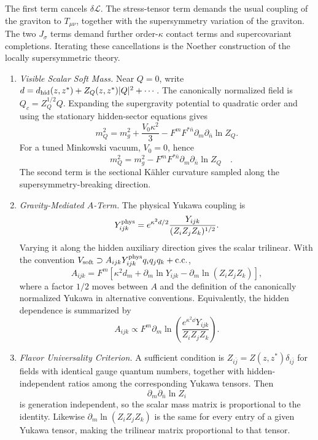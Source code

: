 \begin{enumerate}
  The first term cancels \(\delta\mathcal L\).  The stress-tensor term
  demands the usual coupling of the graviton to \(T_{\mu\nu}\), together
  with the supersymmetry variation of the graviton.  The two
  \(J_\sigma\) terms demand further order-\(\kappa\) contact terms and
  supercovariant completions.  Iterating these cancellations is the
  Noether construction of the locally supersymmetric theory.

  \begin{enumerate}
    \item \emph{Visible Scalar Soft Mass.}
    Near \(Q=0\), write
      \(d=d_{\rm hid}(z,z^*)+Z_Q(z,z^*)|Q|^2+\cdots\).
      The canonically normalized field is \(Q_c=Z_Q^{1/2}Q\).  Expanding the
      supergravity potential to quadratic order and using the stationary
      hidden-sector equations gives
      \[
        m_Q^2=m_g^2+\frac{V_0\kappa^2}{3}
          -F^mF^{*\bar n}
           \partial_m\partial_{\bar n}\ln Z_Q.
      \]
      For a tuned Minkowski vacuum, \(V_0=0\), hence
      \[
        \boxed{\quad m_Q^2=m_g^2
          -F^mF^{*\bar n}
           \partial_m\partial_{\bar n}\ln Z_Q\quad .}
      \]
      The second term is the sectional Kähler curvature sampled along the
      supersymmetry-breaking direction.
    \item \emph{Gravity-Mediated \(A\)-Term.}
    The physical Yukawa coupling is
      \[
        Y^{\rm phys}_{ijk}
          =e^{\kappa^2d/2}
            \frac{Y_{ijk}}{(Z_iZ_jZ_k)^{1/2}}.
      \]
      Varying it along the hidden auxiliary direction gives the scalar
      trilinear.  With the convention
      \(V_{\rm soft}\supset A_{ijk}Y^{\rm phys}_{ijk}q_iq_jq_k+\mathrm{c.c.}\),
      \[
        A_{ijk}
          =F^m\left[
            \kappa^2d_m+\partial_m\ln Y_{ijk}
            -\partial_m\ln(Z_iZ_jZ_k)
          \right],
      \]
      where a factor \(1/2\) moves between \(A\) and the definition of the
      canonically normalized Yukawa in alternative conventions.  Equivalently,
      the hidden dependence is summarized by
      \[
        A_{ijk}\propto
        F^m\partial_m\ln\!
          \left(\frac{e^{\kappa^2\dd}Y_{ijk}}{Z_iZ_jZ_k}\right).
      \]
    \item \emph{Flavor Universality Criterion.}
    A sufficient condition is
      \(Z_{i\bar j}=Z(z,z^*)\delta_{i\bar j}\) for fields with identical
      gauge quantum numbers, together with hidden-independent ratios among
      the corresponding Yukawa tensors.  Then
      \[
        \partial_m\partial_{\bar n}\ln Z_i
      \]
      is generation independent, so the scalar mass matrix is proportional
      to the identity.  Likewise
      \(\partial_m\ln(Z_iZ_jZ_k)\) is the same for every entry of a given
      Yukawa tensor, making the trilinear matrix proportional to that
      tensor.


\end{enumerate}
\end{enumerate}
